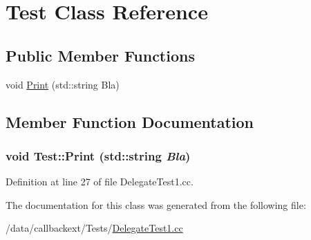 \hypertarget{classTest}{
\section{Test Class Reference}
\label{classTest}
}
\subsection*{Public Member Functions}
\begin{CompactItemize}
\item 
void \hyperlink{classTest_a0}{Print} (std::string Bla)
\end{CompactItemize}


\subsection{Member Function Documentation}
\hypertarget{classTest_a0}{
\subsubsection[Print]{\setlength{\rightskip}{0pt plus 5cm}void Test::Print (std::string {\em Bla})}}
\label{classTest_a0}




Definition at line 27 of file Delegate\-Test1.cc.

The documentation for this class was generated from the following file:\begin{CompactItemize}
\item 
/data/callbackext/Tests/\hyperlink{DelegateTest1_8cc}{Delegate\-Test1.cc}\end{CompactItemize}
